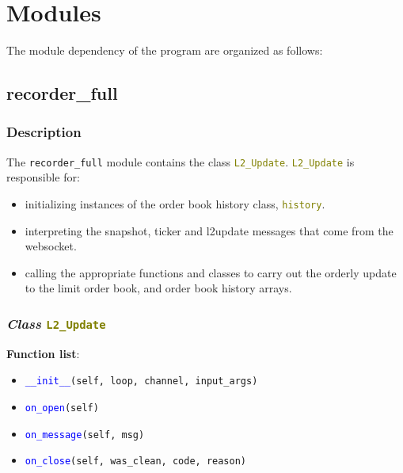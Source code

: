 \section{Modules}
The module dependency of the program are organized as follows:


\subsection{recorder\_full}

\subsubsection{Description}

The \texttt{recorder\_full} module contains the class \textcolor{olive}{\texttt{L2\_Update}}. \textcolor{olive}{\texttt{L2\_Update}} is responsible for:
\begin{itemize}
	\item initializing instances of the order book history class, \textcolor{olive}{\texttt{history}}.
	\item interpreting the snapshot, ticker and l2update messages that come from the websocket.
	\item calling the appropriate functions and classes to carry out the orderly update to the limit order book, and order book history arrays.
\end{itemize}

\subsubsection{\textit{Class} \textcolor{olive}{\texttt{L2\_Update}} }

\textbf{Function list}:
\begin{itemize}
	\item \textcolor{blue}{\texttt{\_\_init\_\_}}\texttt{(self, loop, channel, input\_args)}
	\item
	\textcolor{blue}{\texttt{on\_open}}\texttt{(self)}
	\item \textcolor{blue}{\texttt{on\_message}}\texttt{(self, msg)}
	\item \textcolor{blue}{\texttt{on\_close}}\texttt{(self, was\_clean, code, reason)}
\end{itemize}

